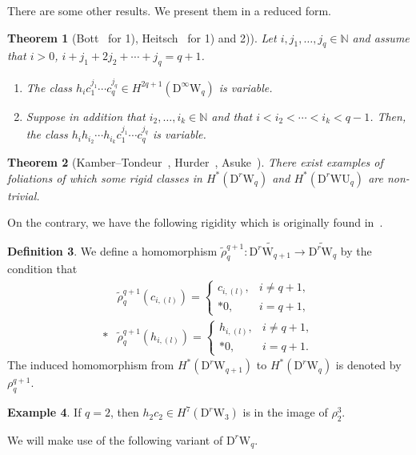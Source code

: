 \documentclass[12pt]{amsart}
\newcommand{\N}{{\mathbb N}}
\newcommand{\WU}{\mathrm{WU}}
\newcommand{\W}{\mathrm{W}}
\newcommand{\D}{\mathrm{D}}
\newtheorem{theorem}{Theorem}[section]
\theoremstyle{definition}
\newtheorem{definition}[theorem]{Definition}
\newtheorem{example}[theorem]{Example}
\theoremstyle{remark}
\begin{document}
There are some other results.
We present them in a reduced form.

\begin{theorem}[Bott~\cite{BB} for 1), Heitsch~\cite{14} for 1) and 2)]
\label{thm_BB}
Let $i,j_1,\ldots,j_q\in\N$ and assume that $i>0$, $i+j_1+2j_2+\cdots+j_q=q+1$.
\begin{enumerate}
\item
The class $h_ic_1^{j_1}\cdots c_q^{j_q}\in H^{2q+1}(\D^\infty\W_q)$ is variable.
\item
Suppose in addition that $i_2,\ldots,i_k\in\N$ and that $i<i_2<\cdots<i_k<q-1$.
Then, the class $h_ih_{i_2}\cdots h_{i_k}c_1^{j_1}\cdots c_q^{j_q}$ is variable.
\end{enumerate}
\end{theorem}

\begin{theorem}[Kamber--Tondeur~\cite{KT}, Hurder~\cite{Hurder:indep}, Asuke~\cite{asuke:indep}]
There exist examples of foliations of which some rigid classes in $H^*(\D^r\W_q)$ and $H^*(\D^r\WU_q)$ are non-trivial.
\end{theorem}

On the contrary, we have the following rigidity which is originally found in~\cite{Heitsch:Topology}.

\begin{definition}
We define a homomorphism $\widetilde\rho^{q+1}_q\colon\widetilde{\D^r\W_{q+1}}\to\widetilde{\D^r\W_q}$ by the condition that
\begin{align*}
&\widetilde\rho^{q+1}_q(c_{i,(l)})=\begin{cases}
c_{i,(l)}, & i\neq q+1,\\*
0, & i=q+1,
\end{cases}\\*
&\widetilde\rho^{q+1}_q(h_{i,(l)})=\begin{cases}
h_{i,(l)}, & i\neq q+1,\\*
0, & i=q+1.
\end{cases}
\end{align*}
The induced homomorphism from $H^*(\D^r\W_{q+1})$ to $H^*(\D^r\W_q)$ is denoted by $\rho^{q+1}_q$.
\end{definition}

\begin{example}
If $q=2$, then $h_2c_2\in H^7(\D^r\W_3)$ is in the image of $\rho^3_2$.
\end{example}

We will make use of the following variant of $\D^r\W_q$.
\end{document}
